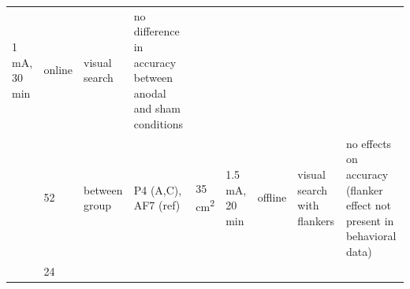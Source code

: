 \documentclass[11pt,]{memoir}
\begin{document}
\begin{longtable}[]{@{}lllllllll@{}}
\begin{minipage}[t]{0.06\columnwidth}
1 mA, 30
min\strut
\end{minipage} & \begin{minipage}[t]{0.05\columnwidth}\raggedright
online\strut
\end{minipage} & \begin{minipage}[t]{0.06\columnwidth}\raggedright
visual
search\strut
\end{minipage} & \begin{minipage}[t]{0.25\columnwidth}\raggedright
no difference in accuracy between anodal and sham
conditions\strut
\end{minipage}\tabularnewline
\begin{minipage}[t]{0.08\columnwidth}\raggedright
\textcite{Kajimura2016}\strut
\end{minipage} & \begin{minipage}[t]{0.03\columnwidth}\raggedright
52\strut
\end{minipage} & \begin{minipage}[t]{0.05\columnwidth}\raggedright
between
group\strut
\end{minipage} & \begin{minipage}[t]{0.15\columnwidth}\raggedright
P4 (A,C), AF7 (ref)\strut
\end{minipage} & \begin{minipage}[t]{0.04\columnwidth}\raggedright
35
cm\textsuperscript{2}\strut
\end{minipage} & \begin{minipage}[t]{0.06\columnwidth}\raggedright
1.5 mA, 20
min\strut
\end{minipage} & \begin{minipage}[t]{0.05\columnwidth}\raggedright
offline\strut
\end{minipage} & \begin{minipage}[t]{0.06\columnwidth}\raggedright
visual
search
with
flankers\strut
\end{minipage} & \begin{minipage}[t]{0.25\columnwidth}\raggedright
no effects on accuracy (flanker effect not present
in behavioral data)\strut
\end{minipage}\tabularnewline
\begin{minipage}[t]{0.08\columnwidth}\raggedright
\textcite{Muller2015}\strut
\end{minipage} & \begin{minipage}[t]{0.03\columnwidth}\raggedright
24\strut
\end{minipage} & \begin{minipage}[t]{0.05\columnwidth}\raggedright

\end{minipage}
\end{longtable}
\end{document}
